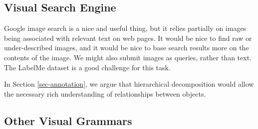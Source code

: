 \subsection{Visual Search Engine}

Google image search is a nice and useful thing, but it relies
partially on images being associated with relevant text on web
pages. It would be nice to find raw or under-described images, and it
would be nice to base search results more on the contents of the
image. We might also submit images as queries, rather than text. The
LabelMe dataset is a good challenge for this task.

In Section \ref{sec-annotation}, we argue that hierarchical
decomposition would allow the necessary rich understanding of
relationships between objects.

\subsection{Other Visual Grammars}
\label{sec-other-grammars}

